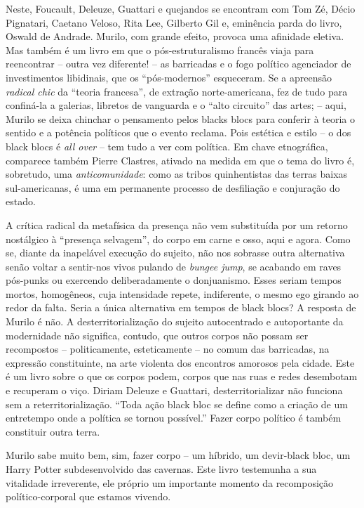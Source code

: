 Neste, Foucault, Deleuze, Guattari e quejandos se encontram com Tom Zé,
Décio Pignatari, Caetano Veloso, Rita Lee, Gilberto Gil e, eminência
parda do livro, Oswald de Andrade. Murilo, com grande efeito, provoca
uma afinidade eletiva. Mas também é um livro em que o pós-estruturalismo
francês viaja para reencontrar -- outra vez diferente! -- as barricadas
e o fogo político agenciador de investimentos libidinais, que os
``pós-modernos'' esqueceram. Se a apreensão \emph{radical chic} da
``teoria francesa'', de extração norte-americana, fez de tudo para
confiná-la a galerias, libretos de vanguarda e o ``alto circuito'' das
artes; -- aqui, Murilo se deixa chinchar o pensamento pelos blacks blocs
para conferir à teoria o sentido e a potência políticos que o evento
reclama. Pois estética e estilo -- o dos black blocs é \emph{all over}
-- tem tudo a ver com política. Em chave etnográfica, comparece também
Pierre Clastres, ativado na medida em que o tema do livro é, sobretudo,
uma \emph{anticomunidade}: como as tribos quinhentistas das terras
baixas sul-americanas, é uma em permanente processo de desfiliação e
conjuração do estado.

A crítica radical da metafísica da presença não vem substituída por um
retorno nostálgico à ``presença selvagem'', do corpo em carne e osso,
aqui e agora. Como se, diante da inapelável execução do sujeito, não nos
sobrasse outra alternativa senão voltar a sentir-nos vivos pulando de
\emph{bungee jump}, se acabando em raves pós-punks ou exercendo
deliberadamente o donjuanismo. Esses seriam tempos mortos, homogêneos,
cuja intensidade repete, indiferente, o mesmo ego girando ao redor da
falta. Seria a única alternativa em tempos de black blocs? A resposta de
Murilo é não. A desterritorialização do sujeito autocentrado e
autoportante da modernidade não significa, contudo, que outros corpos
não possam ser recompostos -- politicamente, esteticamente -- no comum
das barricadas, na expressão constituinte, na arte violenta dos
encontros amorosos pela cidade. Este é um livro sobre o que os corpos
podem, corpos que nas ruas e redes desembotam e recuperam o viço. Diriam
Deleuze e Guattari, desterritorializar não funciona sem a
reterritorialização. ``Toda ação black bloc se define como a criação de
um entretempo onde a política se tornou possível.'' Fazer corpo político
é também constituir outra terra.

Murilo sabe muito bem, sim, fazer corpo -- um híbrido, um devir-black
bloc, um Harry Potter subdesenvolvido das cavernas. Este livro
testemunha a sua vitalidade irreverente, ele próprio um importante
momento da recomposição político-corporal que estamos vivendo.



